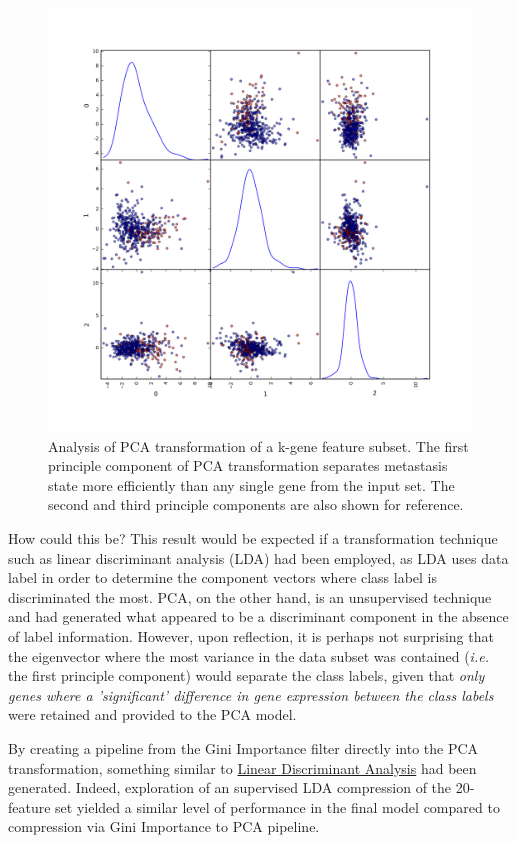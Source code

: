\documentclass[final]{article}
\begin{document}
\begin{figure}[h!]
  \centering
  \includegraphics[scale = 0.5]{pcaScatter}
  \caption{\label{fig:pcaScatter}Analysis of PCA transformation of a k-gene feature subset.  The first principle component of PCA transformation separates metastasis state more efficiently than any single gene from the input set.  The second and third principle components are also shown for reference.}
\end{figure}

How could this be?  This result would be expected if a transformation technique
such as linear discriminant analysis (LDA) had been employed, as LDA uses data
label in order to determine the component vectors where class label is
discriminated the most.  PCA, on the other hand, is an unsupervised technique
and had generated what appeared to be a discriminant component in the absence of
label information.  However, upon reflection, it is perhaps not surprising that
the eigenvector where the most variance in the data subset was contained (\textit{i.e.}
the first principle component) would separate the class labels, given that
\textit{only genes where a 'significant' difference in gene expression between the
class labels} were retained and provided to the PCA model.

By creating a pipeline from the  Gini Importance filter directly into the PCA
transformation, something similar to
\href{http://scikit-learn.org/0.16/modules/generated/sklearn.lda.LDA.html}{Linear
Discriminant Analysis} had been generated.  Indeed, exploration of an supervised
LDA compression of the 20-feature set yielded a similar level of performance in
the final model compared to compression via Gini Importance to PCA pipeline.
\end{document}
